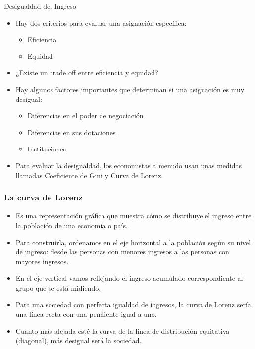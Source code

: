 \documentclass{beamer}
\begin{document}
\begin{frame}{Desigualdad del Ingreso}
        \begin{itemize}
            \item Hay dos criterios para evaluar una asignación específica: 
            \begin{itemize}
                \item Eficiencia
                \item Equidad
            \end{itemize}
            \item ¿Existe un trade off entre eficiencia y equidad?
            \item Hay algunos factores importantes que determinan si una asignación es muy desigual:
            \begin{itemize}
                \item Diferencias en el poder de negociación
                \item Diferencias en sus dotaciones
                \item Instituciones
            \end{itemize}
            \item Para evaluar la desigualdad, los economistas a menudo usan unas medidas llamadas Coeficiente de Gini y Curva de Lorenz.
        \end{itemize}
\end{frame}

\begin{frame} 
\frametitle{La curva de Lorenz}
\begin{itemize}
\item Es una representación gráfica que muestra cómo se distribuye el ingreso entre la población de una economía o país. 
\item Para construirla, ordenamos en el eje horizontal a la población según su nivel de ingreso: desde las personas con menores ingresos a las personas con mayores ingresos.
\item En el eje vertical vamos reflejando el ingreso acumulado correspondiente al grupo que se está midiendo.
\item Para una sociedad con perfecta igualdad de ingresos, la curva de Lorenz sería una línea recta con una pendiente igual a uno.
\item Cuanto más alejada esté la curva de la línea de distribución equitativa (diagonal), más desigual será la sociedad.
\end{itemize}
\end{frame}
\end{document}
